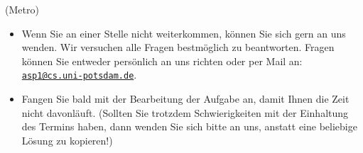 \documentclass[a4paper,12pt,ngerman]{article}
\begin{document}
\begin{PraktikumsAufgabe}{2}{(Metro)}
\begin{itemize}
\begin{tabular}{@{}l}
\end{tabular}
\item Wenn Sie an einer Stelle nicht weiterkommen, können Sie sich gern an uns wenden.
      Wir versuchen alle Fragen bestmöglich zu beantworten.
      Fragen k\"onnen Sie entweder pers\"onlich an uns richten oder per Mail an:
      \href{mailto:asp1@cs.uni-potsdam.de}{\texttt{asp1@cs.uni-potsdam.de}}.
\item Fangen Sie bald mit der Bearbeitung der Aufgabe an, damit Ihnen die Zeit nicht davonläuft.
      (Sollten Sie trotzdem Schwierigkeiten mit der Einhaltung des Termins
       haben, dann wenden Sie sich bitte an uns, anstatt eine beliebige Lösung
       zu kopieren!)
\end{itemize}

\end{PraktikumsAufgabe}
\end{document}
